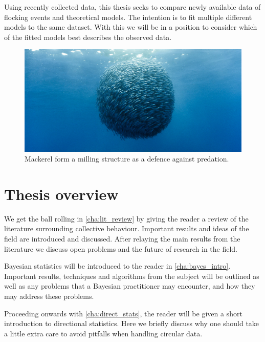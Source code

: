 Using recently collected data, this thesis seeks to compare newly available data of
flocking events and theoretical models. The intention is to fit multiple different models
to the same dataset. With this we will be in a position to consider which of the fitted
models best describes the observed data.

\begin{figure}[b]
    \includegraphics[width=\textwidth]{milling.jpg}
    \caption{Mackerel form a milling structure as a defence against predation.}
    \label{fig:milling}
\end{figure}

\section{Thesis overview}
\label{sec:overview_of_thesis}

We get the ball rolling in \cref{cha:lit_review} by giving the reader a
review of the literature surrounding collective behaviour. Important results and ideas of
the field are introduced and discussed. After relaying the main results from the
literature we discuss open problems and the future of research in the field.

Bayesian statistics will be introduced to the reader in \cref{cha:bayes_intro}. Important
results, techniques and algorithms from the subject will be outlined as well as any
problems that a Bayesian practitioner may encounter, and how they may address these problems.

Proceeding onwards with \cref{cha:direct_stats}, the reader will be given a short
introduction to directional statistics. Here we briefly discuss why one should take a
little extra care to avoid pitfalls when handling circular data.




